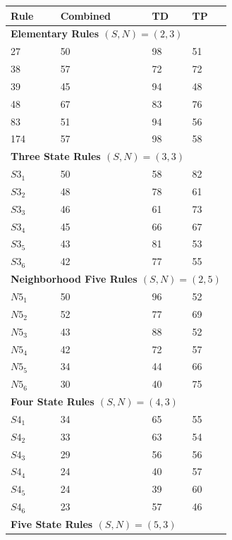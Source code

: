 \documentclass{elsarticle}
\begin{document}
\begin{multicols}{2}
\begin{table}[H] \centering
\small
\begin{tabular}{|l|l|l|l|}
\hline
\textbf{Rule} & \textbf{Combined} & \textbf{TD} & \textbf{TP} \\ \hline
\multicolumn{4}{|l|}{\textbf{Elementary Rules \boldmath$(S,N) = (2,3)$}} \\ 
\hline
27 & 50 & 98 & 51 \\ \hline
38 & 57 & 72 & 72 \\ \hline
39 & 45 & 94 & 48 \\ \hline
48 & 67 & 83 & 76 \\ \hline
83 & 51 & 94 & 56 \\ \hline
174 & 57 & 98 & 58 \\ \hline
   \multicolumn{4}{|l|}{\textbf{Three State Rules \boldmath$(S,N) = (3,3)$}} \\ 
   \hline
$S3_{1}$ & 50 & 58 & 82 \\ \hline
$S3_{2}$ & 48 & 78 & 61 \\ \hline
$S3_{3}$ & 46 & 61 & 73 \\ \hline
$S3_{4}$ & 45 & 66 & 67 \\ \hline
$S3_{5}$ & 43 & 81 & 53 \\ \hline
$S3_{6}$ & 42 & 77 & 55 \\ \hline
\multicolumn{4}{|l|}{\textbf{Neighborhood Five Rules \boldmath$(S,N) = (2,5)$}} 
\\ \hline
$N5_{1}$ & 50 & 96 & 52 \\ \hline
$N5_{2}$ & 52 & 77 & 69 \\ \hline
$N5_{3}$ & 43 & 88 & 52 \\ \hline
$N5_{4}$ & 42 & 72 & 57 \\ \hline
$N5_{5}$ & 34 & 44 & 66 \\  \hline
$N5_{6}$ & 30 & 40 & 75 \\ \hline
\multicolumn{4}{|l|}{\textbf{Four State Rules \boldmath$(S,N) = (4,3)$}} \\ 
\hline
$S4_{1}$ & 34 & 65 & 55 \\ \hline
$S4_{2}$ & 33 & 63 & 54 \\ \hline
$S4_{3}$ & 29 & 56 & 56 \\ \hline
$S4_{4}$ & 24 & 40 & 57 \\ \hline
$S4_{5}$ & 24 & 39 & 60 \\ \hline
$S4_{6}$ & 23 & 57 & 46 \\ \hline
\multicolumn{4}{|l|}{\textbf{Five State Rules \boldmath$(S,N) = (5,3)$}} \\ 

\end{tabular}
\end{table}
\end{multicols}
\end{document}

